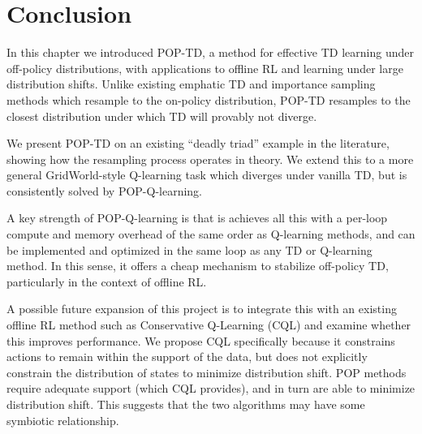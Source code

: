 \section{Conclusion}
In this chapter we introduced POP-TD, a method for effective TD learning under off-policy distributions, with applications to offline RL and learning under large distribution shifts. Unlike existing emphatic TD and importance sampling methods which resample to the on-policy distribution, POP-TD resamples to the closest distribution under which TD will provably not diverge.

We present POP-TD on an existing ``deadly triad'' example in the literature, showing how the resampling process operates in theory. We extend this to a more general GridWorld-style Q-learning task which diverges under vanilla TD, but is consistently solved by POP-Q-learning.

A key strength of POP-Q-learning is that is achieves all this with a per-loop compute and memory overhead of the same order as Q-learning methods, and can be implemented and optimized in the same loop as any TD or Q-learning method. In this sense, it offers a cheap mechanism to stabilize off-policy TD, particularly in the context of offline RL.

A possible future expansion of this project is to integrate this with an existing offline RL method such as Conservative Q-Learning (CQL) and examine whether this improves performance. We propose CQL specifically because it constrains actions to remain within the support of the data, but does not explicitly constrain the distribution of states to minimize distribution shift. POP methods require adequate support (which CQL provides), and in turn are able to minimize distribution shift. This suggests that the two algorithms may have some symbiotic relationship.
